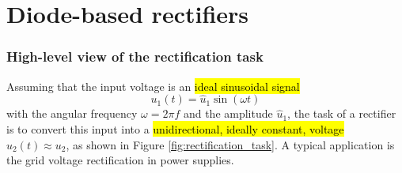 \section{Diode-based rectifiers}

\begin{frame}
    \frametitle{High-level view of the rectification task}
    Assuming that the input voltage is an \hl{ideal sinusoidal signal} $$u_1(t) = \hat{u}_1 \sin(\omega t)$$ with the angular frequency $\omega = 2\pi f$ and the amplitude $\hat{u}_1$, the task of a rectifier is to convert this input into a \hl{unidirectional, ideally constant, voltage} $u_2(t)\approx u_2$, as shown in Figure \ref{fig:rectification_task}. A typical application is the grid voltage rectification in power supplies.


\end{frame}
